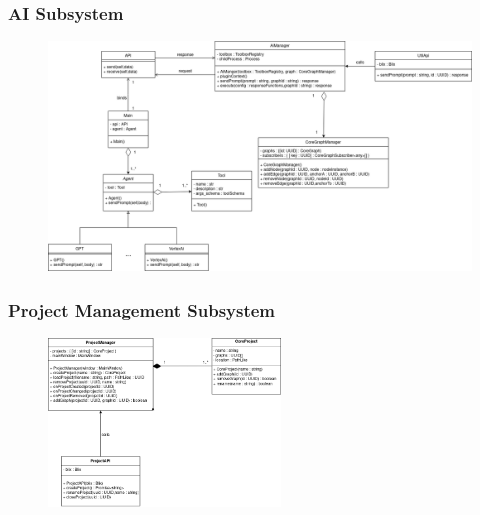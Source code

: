 \documentclass[11pt,a4paper]{article}
\begin{document}
\subsubsection*{AI Subsystem}
\begin{figure}[htbp]
    \centering
    \includegraphics[width=1.1\textwidth]{../diagramPng/AI-subsystem.png}
\end{figure}

\clearpage

\subsubsection*{Project Management Subsystem}
\begin{figure}[htbp]
    \centering
    \includegraphics[width=0.55\textwidth]{../diagramPng/Project-subsystem.png}
\end{figure}

\end{document}
